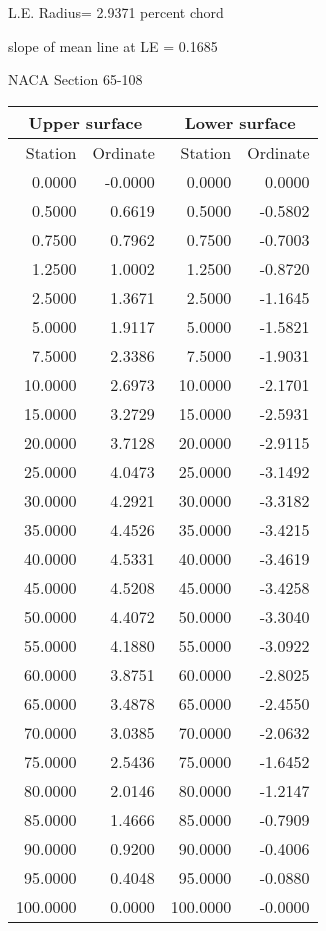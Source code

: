 \documentclass[11pt]{book}
\begin{document}
L.E. Radius=  2.9371 percent chord


 slope of mean line at LE =  0.1685
 \newpage
  \label{s65-108}
 \begin{Large}
 NACA Section 65-108
 \end{Large}
  
 \vspace{8mm}
 \begin{tabular}{|r|r|r|r|} \hline 
 \multicolumn{2}{|c|}{Upper surface} & \multicolumn{2}{|c|}{Lower surface} \\
 \hline
 Station & Ordinate & Station & Ordinate \\
 \hline
0.0000 & -0.0000 & 0.0000 & 0.0000 \\
0.5000 & 0.6619 & 0.5000 & -0.5802 \\
0.7500 & 0.7962 & 0.7500 & -0.7003 \\
1.2500 & 1.0002 & 1.2500 & -0.8720 \\
2.5000 & 1.3671 & 2.5000 & -1.1645 \\
5.0000 & 1.9117 & 5.0000 & -1.5821 \\
7.5000 & 2.3386 & 7.5000 & -1.9031 \\
10.0000 & 2.6973 & 10.0000 & -2.1701 \\
15.0000 & 3.2729 & 15.0000 & -2.5931 \\
20.0000 & 3.7128 & 20.0000 & -2.9115 \\
25.0000 & 4.0473 & 25.0000 & -3.1492 \\
30.0000 & 4.2921 & 30.0000 & -3.3182 \\
35.0000 & 4.4526 & 35.0000 & -3.4215 \\
40.0000 & 4.5331 & 40.0000 & -3.4619 \\
45.0000 & 4.5208 & 45.0000 & -3.4258 \\
50.0000 & 4.4072 & 50.0000 & -3.3040 \\
55.0000 & 4.1880 & 55.0000 & -3.0922 \\
60.0000 & 3.8751 & 60.0000 & -2.8025 \\
65.0000 & 3.4878 & 65.0000 & -2.4550 \\
70.0000 & 3.0385 & 70.0000 & -2.0632 \\
75.0000 & 2.5436 & 75.0000 & -1.6452 \\
80.0000 & 2.0146 & 80.0000 & -1.2147 \\
85.0000 & 1.4666 & 85.0000 & -0.7909 \\
90.0000 & 0.9200 & 90.0000 & -0.4006 \\
95.0000 & 0.4048 & 95.0000 & -0.0880 \\
100.0000 & 0.0000 & 100.0000 & -0.0000 \\
 \hline 
 \end{tabular}
\end{document}

